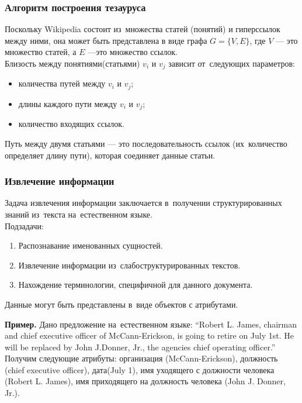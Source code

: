 \documentclass{beamer}
\begin{document}
\begin{frame}
\frametitle{Алгоритм построения тезауруса}
Поскольку Wikipedia состоит из~множества статей (понятий) и гиперссылок между ними, она может быть представлена
в виде графа $G = \{V,E\}$, где $V$  --- это множество статей, а $E$ ---это множество ссылок.\\
Близость между понятиями(статьями) $v_i$ и $v_j$ зависит от~следующих параметров:

\vspace{1cm}

\begin{itemize}
\item{количества путей между $v_i$ и $v_j$;}
\item{длины каждого пути между $v_i$ и $v_j$;}
\item{количество входящих ссылок.}
\end{itemize}

\vspace{1cm}
Путь между двумя статьями --- это последовательность ссылок (их~количество определяет длину пути), которая соединяет данные статьи.

\end{frame}

\begin{frame}
\frametitle{Извлечение информации}
Задача извлечения информации заключается в~получении структурированных знаний
из~текста на~естественном языке.\\

\vspace{1cm}
Подзадачи:
\begin{enumerate}
\item{Распознавание именованных сущностей.}
\item{Извлечение информации из~слабоструктурированных текстов.}
\item{Нахождение терминологии, специфичной для данного документа.}
\end{enumerate}

\vspace{1cm}

Данные могут быть представлены в~виде объектов с атрибутами.

\vspace{1cm}
{\bf Пример.} Дано предложение на~естественном языке: 
``Robert L. James, chairman and chief executive
officer of McCann-Erickson, is going to retire on July 1st. He will be replaced
by John J.Donner, Jr., the agencies chief operating officer.''
Получим следующие атрибуты: организация (McCann-Erickson), должность (chief executive officer),
дата(July 1), имя уходящего с должности человека (Robert L. James), имя
приходящего на должность человека (John J. Donner, Jr.).

\end{frame}
\end{document}

